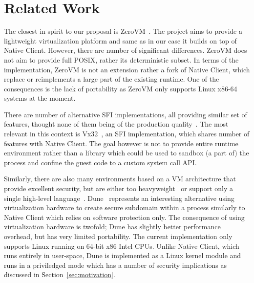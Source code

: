 \section{Related Work}
\label{sec:related}

The closest in spirit to our proposal is ZeroVM~\cite{zerovm}. The
project aims to provide a lightweight virtualization platform and same
as in our case it builds on top of Native Client.  However, there are
number of significant differences. ZeroVM does not aim to provide full
POSIX, rather its deterministic subset. In terms of the implementation,
ZeroVM is not an extension rather a fork of Native Client, which replace
or reimplements a large part of the existing runtime. One of the
consequences is the lack of portability as ZeroVM only supports Linux
x86-64 systems at the moment.

There are number of alternative SFI implementations, all providing
similar set of features, thought none of them being of the production
quality~\cite{small:coots97,mccamant:usenix-sec06}.  The most relevant
in this context is Vx32~\cite{ford:usenix-atc08}, an SFI implementation,
which shares number of features with Native Client. The goal however is
not to provide entire runtime environment rather than a library which
could be used to sandbox (a part of) the process and confine the guest
code to a custom system call API. 


Similarly, there are also many environments based on a VM architecture
that provide excellent security, but are either too
heavyweight~\cite{adl-tabatabai:pldi96,bugnion:tocs97,waldspurger:osdi02,barham:sosp03,ford:fast05}
or support only a single high-level
language~\cite{lindholm:java99,richter:clr10}. Dune~\cite{belay:osdi12}
represents an interesting alternative using virtualization hardware to
create secure subdomain within a process similarly to Native Client
which relies on software protection only. The consequence of using
virtualization hardware is twofold; Dune has slightly better performance
overhead, but has very limited portability.  The current implementation
only supports Linux running on 64-bit x86 Intel CPUs. Unlike Native
Client, which runs entirely in user-space, Dune is implemented as a
Linux kernel module and runs in a priviledged mode which has a number of
security implications as discussed in Section~\ref{sec:motivation}.


